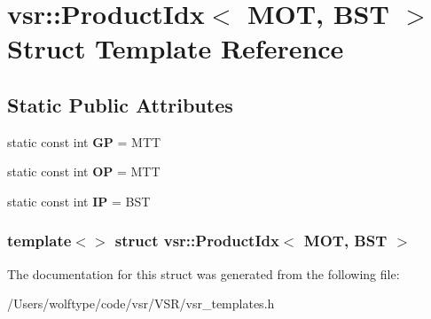 \hypertarget{structvsr_1_1_product_idx_3_01_m_o_t_00_01_b_s_t_01_4}{\section{vsr\-:\-:Product\-Idx$<$ M\-O\-T, B\-S\-T $>$ Struct Template Reference}
\label{structvsr_1_1_product_idx_3_01_m_o_t_00_01_b_s_t_01_4}
}
\subsection*{Static Public Attributes}
\begin{DoxyCompactItemize}
\item 
\hypertarget{structvsr_1_1_product_idx_3_01_m_o_t_00_01_b_s_t_01_4_abf30a9a053cf0712ddf210fce0c3f80d}{static const int {\bfseries G\-P} = M\-T\-T}\label{structvsr_1_1_product_idx_3_01_m_o_t_00_01_b_s_t_01_4_abf30a9a053cf0712ddf210fce0c3f80d}

\item 
\hypertarget{structvsr_1_1_product_idx_3_01_m_o_t_00_01_b_s_t_01_4_a1d032b36b7bf2be26f136740a5e798d3}{static const int {\bfseries O\-P} = M\-T\-T}\label{structvsr_1_1_product_idx_3_01_m_o_t_00_01_b_s_t_01_4_a1d032b36b7bf2be26f136740a5e798d3}

\item 
\hypertarget{structvsr_1_1_product_idx_3_01_m_o_t_00_01_b_s_t_01_4_a016a956de50bcca5d3f8911c751c5e32}{static const int {\bfseries I\-P} = B\-S\-T}\label{structvsr_1_1_product_idx_3_01_m_o_t_00_01_b_s_t_01_4_a016a956de50bcca5d3f8911c751c5e32}

\end{DoxyCompactItemize}
\subsubsection*{template$<$$>$ struct vsr\-::\-Product\-Idx$<$ M\-O\-T, B\-S\-T $>$}



The documentation for this struct was generated from the following file\-:\begin{DoxyCompactItemize}
\item 
/\-Users/wolftype/code/vsr/\-V\-S\-R/vsr\-\_\-templates.\-h\end{DoxyCompactItemize}
